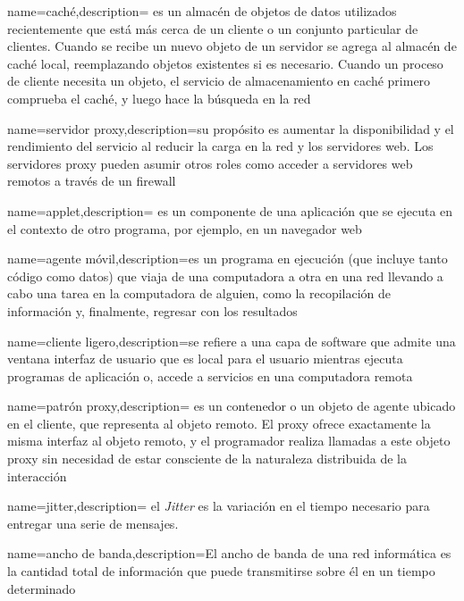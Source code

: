 {name={cach\'e},description={ es un almacén de objetos de datos utilizados recientemente que está más cerca de un cliente o un conjunto particular de clientes. Cuando se recibe un nuevo objeto de un servidor se agrega al almacén de caché local, reemplazando objetos existentes si es necesario. Cuando un proceso de cliente necesita un objeto, el servicio de almacenamiento en caché primero comprueba el caché, y luego hace la b\'usqueda en la red}}	 

{name={servidor proxy},description={su propósito  es aumentar la	disponibilidad y el rendimiento del servicio al reducir la carga en la red  y los servidores web. Los servidores proxy pueden asumir otros roles  como acceder a servidores web remotos a través de un firewall}}	 

{name={applet},description={ es un componente de una aplicación que se ejecuta en el contexto de otro programa, por ejemplo, en un navegador web}}

{name={agente m\'ovil},description={es un programa en ejecución (que incluye tanto código como datos) que  viaja de una computadora a otra en una red llevando a cabo una tarea en la computadora de alguien, como la recopilación de información y, finalmente, regresar con los resultados}}	 	 


{name={cliente ligero},description={se refiere a una capa de software que admite una ventana interfaz de usuario que es local para el usuario mientras ejecuta programas de aplicación o, accede a servicios en una computadora remota }}	 

{name={patr\'on proxy},description={ es un contenedor o un objeto de agente ubicado en el cliente,  que representa al objeto remoto. El proxy ofrece exactamente la misma interfaz al objeto remoto, y el programador realiza llamadas a este objeto proxy sin necesidad de estar consciente de la naturaleza distribuida de la interacción}}	

{name={jitter},description={ el \textit{Jitter}  es la variación en el tiempo necesario para entregar una serie de mensajes.}}	

{name={ancho de banda},description={El ancho de banda de una red informática es la cantidad total de información que puede 	transmitirse sobre él en un tiempo determinado }}	



